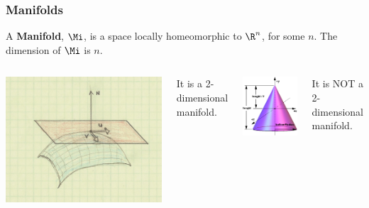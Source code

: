 \begin{frame}
  \frametitle{Manifolds}
  \begin{definition}
    A \alert{\bf Manifold}, $\Mi$, is a space locally homeomorphic to $\R^n$, for some $n$. The dimension of $\Mi$ is $n$.
  \end{definition}
  \begin{columns}
    \begin{center}
      \includegraphics[scale=.11]{Pictures/Tang-vect2.jpg}
    \end{center}
    It \alert{is} a 2-dimensional manifold.
    \begin{center}
      \includegraphics[scale=.3]{Pictures/cone.png}
    \end{center}
    It \alert{is NOT} a 2-dimensional manifold.
  \end{columns}
\end{frame}

